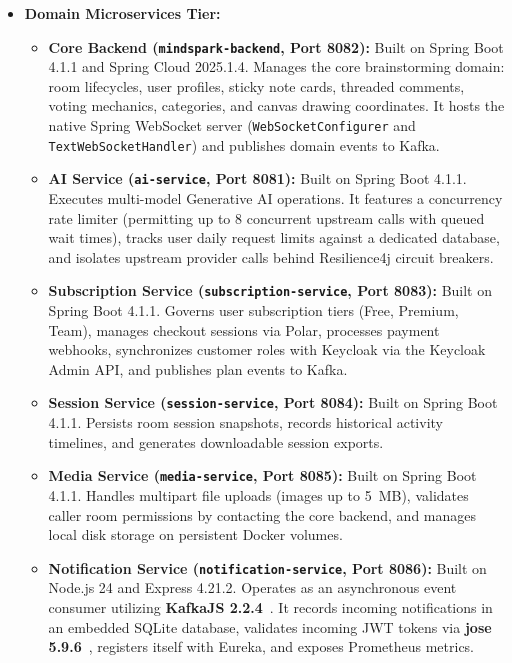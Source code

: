 \begin{itemize}[leftmargin=1.5em]
    \item \textbf{Domain Microservices Tier:}
    \begin{itemize}[leftmargin=1.2em]
        \item \textbf{Core Backend (\texttt{mindspark-backend}, Port 8082):} Built on Spring Boot 4.1.1 and Spring Cloud 2025.1.4. Manages the core brainstorming domain: room lifecycles, user profiles, sticky note cards, threaded comments, voting mechanics, categories, and canvas drawing coordinates. It hosts the native Spring WebSocket server (\texttt{WebSocketConfigurer} and \texttt{TextWebSocketHandler}) and publishes domain events to Kafka.
        \item \textbf{AI Service (\texttt{ai-service}, Port 8081):} Built on Spring Boot 4.1.1. Executes multi-model Generative AI operations. It features a concurrency rate limiter (permitting up to 8 concurrent upstream calls with queued wait times), tracks user daily request limits against a dedicated database, and isolates upstream provider calls behind Resilience4j circuit breakers.
        \item \textbf{Subscription Service (\texttt{subscription-service}, Port 8083):} Built on Spring Boot 4.1.1. Governs user subscription tiers (Free, Premium, Team), manages checkout sessions via Polar, processes payment webhooks, synchronizes customer roles with Keycloak via the Keycloak Admin API, and publishes plan events to Kafka.
        \item \textbf{Session Service (\texttt{session-service}, Port 8084):} Built on Spring Boot 4.1.1. Persists room session snapshots, records historical activity timelines, and generates downloadable session exports.
        \item \textbf{Media Service (\texttt{media-service}, Port 8085):} Built on Spring Boot 4.1.1. Handles multipart file uploads (images up to 5~MB), validates caller room permissions by contacting the core backend, and manages local disk storage on persistent Docker volumes.
        \item \textbf{Notification Service (\texttt{notification-service}, Port 8086):} Built on Node.js 24 and Express 4.21.2. Operates as an asynchronous event consumer utilizing \textbf{KafkaJS 2.2.4}~\cite{kafkajs2026}. It records incoming notifications in an embedded SQLite database, validates incoming JWT tokens via \textbf{jose 5.9.6}~\cite{jose2026}, registers itself with Eureka, and exposes Prometheus metrics.
    \end{itemize}
\end{itemize}

